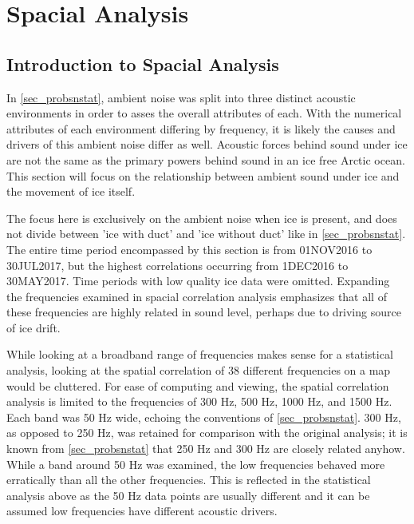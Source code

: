 
\chapter{Spacial Analysis} \label{chap_spacial}

\section{Introduction to Spacial Analysis} \label{sec_intro_spac}

In \autoref{sec_probsnstat}, ambient noise was split into three distinct acoustic environments in order to asses the overall attributes of each. With the numerical attributes of each environment differing by frequency, it is likely the causes and drivers of this ambient noise differ as well. Acoustic forces behind sound under ice are not the same as the primary powers behind sound in an ice free Arctic ocean. This section will focus on the relationship between ambient sound under ice and the movement of ice itself.

The focus here is exclusively on the ambient noise when ice is present, and does not divide between 'ice with duct' and 'ice without duct' like in \autoref{sec_probsnstat}. The entire time period encompassed by this section is from 01NOV2016 to 30JUL2017, but the highest correlations occurring from 1DEC2016 to 30MAY2017. Time periods with low quality ice data were omitted. Expanding the frequencies examined in spacial correlation analysis emphasizes that all of these frequencies are highly related in sound level, perhaps due to driving source of ice drift. 

While looking at a broadband range of frequencies makes sense for a statistical analysis, looking at the spatial correlation of 38 different frequencies on a map would be cluttered. For ease of computing and viewing, the spatial correlation analysis is limited to the frequencies of 300 Hz, 500 Hz, 1000 Hz, and 1500 Hz. Each band was 50 Hz wide, echoing the conventions of \autoref{sec_probsnstat}. 300 Hz, as opposed to 250 Hz, was retained for comparison with the original analysis; it is known from \autoref{sec_probsnstat} that 250 Hz and 300 Hz are closely related anyhow. While a band around 50 Hz was examined, the low frequencies behaved more erratically than all the other frequencies. This is reflected in the statistical analysis above as the 50 Hz data points are usually different and it can be assumed low frequencies have different acoustic drivers. 

